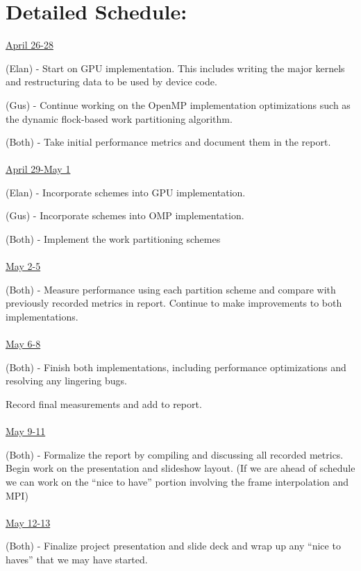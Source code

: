 \documentclass[12pt]{article}
\begin{document}
\section*{Detailed Schedule:} 
\underline{April 26-28}
\par (Elan) - Start on GPU implementation. This includes writing the major kernels and restructuring data to be used by device code.
\par (Gus) - Continue working on the OpenMP implementation optimizations such as the dynamic flock-based work partitioning algorithm. 
\par (Both) - Take initial performance metrics and document them in the report.
\\\\
\underline{April 29-May 1}
\par (Elan) - Incorporate schemes into GPU implementation.
\par (Gus) - Incorporate schemes into OMP implementation.
\par (Both) - Implement the work partitioning schemes 
\\\\
\underline{May 2-5}
\par (Both) - Measure performance using each partition scheme and compare with previously recorded metrics in report. Continue to make improvements to both implementations.
\\\\
\underline{May 6-8}
\par (Both) - Finish both implementations, including performance optimizations and resolving any lingering bugs.
\par Record final measurements and add to report. 
\\\\
\underline{May 9-11}
\par (Both) - Formalize the report by compiling and discussing all recorded metrics. Begin work on the presentation and slideshow layout. (If we are ahead of schedule we can work on the ``nice to have'' portion involving the frame interpolation and MPI)
\\\\
\underline{May 12-13}
\par (Both) - Finalize project presentation and slide deck and wrap up any ``nice to haves'' that we may have started.
\end{document}
